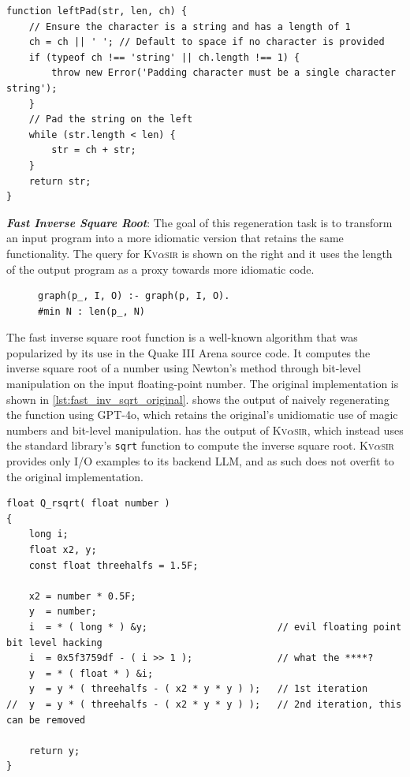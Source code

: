 \documentclass[nonacm,sigplan]{acmart}
\def\gptmodel{{GPT-4o}\xspace}
\newcommand{\sys}{{\scshape Kv{$\alpha$}sir}\xspace}
\newcommand{\heading}[1]{\vspace{2pt}\noindent\textbf{\emph{#1}}:\enspace}
\newcommand{\ttt}[1]{\texttt{#1}\xspace}
\begin{document}
\begin{listing}[htpb]
  \begin{verbatim}
function leftPad(str, len, ch) {
    // Ensure the character is a string and has a length of 1
    ch = ch || ' '; // Default to space if no character is provided
    if (typeof ch !== 'string' || ch.length !== 1) {
        throw new Error('Padding character must be a single character string');
    }
    // Pad the string on the left
    while (str.length < len) {
        str = ch + str;
    }
    return str;
}
  \end{verbatim}
  \caption{The output of \sys, having regenerated \ttt{leftPad}.}
\end{listing}

\heading{Fast Inverse Square Root}
The goal of this regeneration task is to transform an input 
program into a more idiomatic version that retains the same functionality.
The query for \sys is shown on the right and it uses the length of the output program as a proxy towards 
more idiomatic code.
\begin{figure}
\begin{verbatim}
graph(p_, I, O) :- graph(p, I, O).
#min N : len(p_, N)
\end{verbatim}
\end{figure}
The fast inverse square root function is a well-known algorithm that was
popularized by its use in the Quake III Arena source code.
It computes the inverse square root of a number using 
Newton's method through bit-level manipulation on the input floating-point number.
The original implementation is shown in \cref{lst:fast_inv_sqrt_original}.
 shows the output of naively regenerating the function using \gptmodel,
which retains the original's unidiomatic use of magic numbers and bit-level manipulation.
 has the output of \sys, which instead uses the standard library's
\ttt{sqrt} function to compute the inverse square root.
\sys provides only I/O examples to its backend LLM, and as such does not overfit to the original implementation.

\begin{listing}[htpb]
\begin{verbatim}
float Q_rsqrt( float number )
{
	long i;
	float x2, y;
	const float threehalfs = 1.5F;

	x2 = number * 0.5F;
	y  = number;
	i  = * ( long * ) &y;                       // evil floating point bit level hacking
	i  = 0x5f3759df - ( i >> 1 );               // what the ****?
	y  = * ( float * ) &i;
	y  = y * ( threehalfs - ( x2 * y * y ) );   // 1st iteration
//	y  = y * ( threehalfs - ( x2 * y * y ) );   // 2nd iteration, this can be removed

	return y;
}
\end{verbatim}
  \caption{The original implementation of the fast inverse square root function 
  found in the Quake III source code~\cite{fast_inv_sqrt}}
  \label{lst:fast_inv_sqrt_original}
\end{listing}
\end{document}
